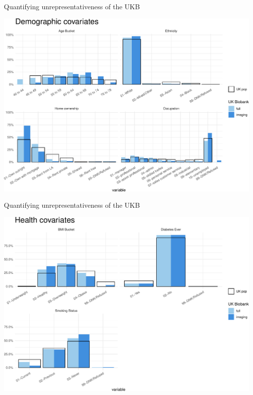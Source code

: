\documentclass[
  ignorenonframetext,
]{beamer}
\begin{document}
\begin{frame}{Quantifying unrepresentativeness of the UKB}
\protect\hypertarget{quantifying-unrepresentativeness-of-the-ukb}{}

\begin{center}\includegraphics[width=0.95\linewidth]{fmrib-deck-20191002_files/figure-beamer/plot-selection-bias-demos-1} \end{center}

\end{frame}

\begin{frame}{Quantifying unrepresentativeness of the UKB}
\protect\hypertarget{quantifying-unrepresentativeness-of-the-ukb-1}{}

\begin{center}\includegraphics[width=0.95\linewidth]{fmrib-deck-20191002_files/figure-beamer/plot-selection-bias-health-1} \end{center}

\end{frame}
\end{document}
